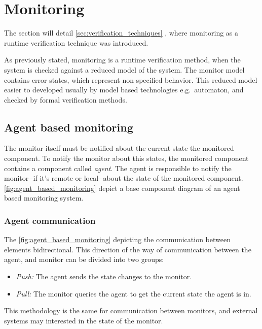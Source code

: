 
\chapter{Monitoring}
\label{ch:monitoring}

The section will detail \cref{sec:verification_techniques} , where monitoring as a runtime verification technique was introduced.

As previously stated, monitoring is a runtime verification method, when the system is checked against a reduced model of the system. The monitor model contains error states, which represent non specified behavior. This reduced model easier to developed usually by model based technologies e.g.\ automaton, and checked by formal verification methods.

\section{Agent based monitoring}

The monitor itself must be notified about the current state the monitored component. To notify the monitor about this states, the monitored component contains a component called \emph{agent}. The agent is responsible to notify the monitor\,--if it's remote or local--\,about the state of the monitored component.  \cref{fig:agent_based_monitoring} depict a base component diagram of an agent based monitoring system.

\subsection{Agent communication}

The \cref{fig:agent_based_monitoring} depicting the communication between elements bidirectional. This direction of the way of communication between the agent, and monitor can be divided into two groups:
\begin{itemize}
	\item \emph{Push:} The agent sends the state changes to the monitor.
	\item \emph{Pull:} The monitor queries the agent to get the current state the agent is in.
\end{itemize}

This methodology is the same for communication between monitors, and external systems may interested in the state of the monitor.


